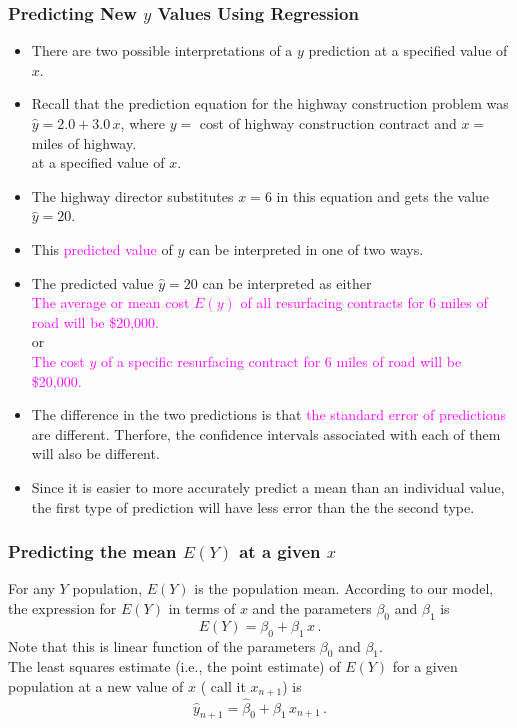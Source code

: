 \documentclass[xcolor=dvipsnames,12pt]{beamer}
\begin{document}
\begin{frame}
\frametitle{Predicting New $y$ Values Using Regression}
\begin{itemize}
\item There are two possible interpretations of a $y$ prediction
at a specified value of $x$.\\[.1in]
\item Recall that the prediction equation for the highway construction 
problem was $\hat{y} = 2.0 + 3.0\,x$, where $y=$ cost of highway
construction contract and $x=$ miles of highway. \\[.1in]
at a specified value of $x$.\\[.1in]
\item The highway director
substitutes $x=6$ in this equation and gets the value
$\hat{y}=20$.\\[.1in]
\item This \textcolor{magenta}{predicted value}  of $y$ can be interpreted in one of two ways.
\end{itemize}
\end{frame}

\begin{frame}
\begin{itemize}
\item The predicted value $\hat{y}=20$ can be interpreted as either\\[.2in]
{\textcolor{magenta}{The average or mean cost $E(y)$ of  all resurfacing contracts for 6
miles of road will be \$20,000.}}\\[.1in]
or \\[.1in]
{\textcolor{magenta}{The cost $y$ of a specific resurfacing contract for 6
miles of road will be \$20,000.}}\\[.2in]
\item The difference in the two predictions is that \textcolor{magenta}{the standard error
of predictions} are different. Therfore, the confidence intervals associated
with each of them will also be different. \\[.1in]
\item  Since it is easier to more
accurately predict a mean than an individual value, the first type of
prediction will have less error than the the second type. 
\end{itemize}
\end{frame}


\begin{frame}
\frametitle{Predicting the mean {\boldmath$E(Y)$} at a given {\boldmath$x$}}
 For any $Y$ population, $E(Y)$ is the population mean. 
According to our model, the expression for $E(Y)$ in terms of
$x$ and the parameters $\beta_0$ and $\beta_1$ is
$$
  E(Y) = \beta_0 + \beta_1\,x \, .
$$
 Note that this is linear function of the parameters $\beta_0$ and $\beta_1$.\\[.1in]
 The least squares estimate (i.e., the point estimate) of $E(Y)$ for a given population 
at a new value of $x$ ( call it  $x_{n+1}$) is
$$
  \hat{y}_{n+1} = \hat{\beta}_0 + \hat{\beta}_1\, x_{n+1}\, .
$$
\end{frame}
\end{document}

